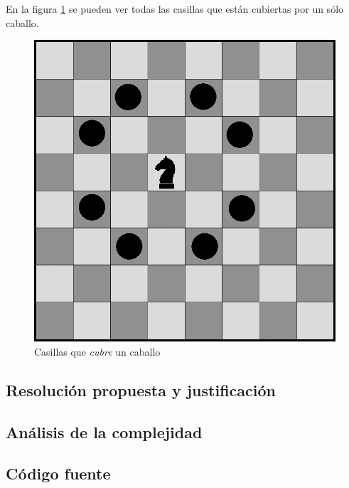 \documentclass[a4paper]{article}
\begin{document}
En la figura \ref{caballito} se pueden ver todas las casillas que est\'an cubiertas por un s\'olo caballo.


 \begin{figure}[h!]
   \begin{center}
 	\includegraphics[scale=0.3]{imagenes/ej3/caballito.png}
 	\caption{Casillas que \emph{cubre} un caballo}
 	\label{caballito}	
   \end{center}
 \end{figure}



\newpage
\subsection{Resoluci\'on propuesta y justificaci\'on}

\newpage
\subsection{An\'alisis de la complejidad}
\newpage
\subsection{C\'odigo fuente}
\newpage
\end{document}
